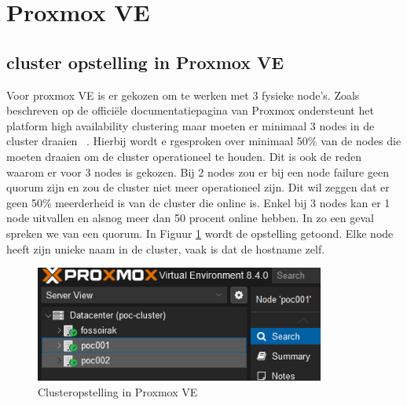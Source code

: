 


\section{Proxmox VE}%
\label{sec:ProxomoxVE}
\subsection{cluster opstelling in Proxmox VE}
Voor proxmox VE is er gekozen om te werken met 3 fysieke node's. Zoals beschreven op de officiële documentatiepagina van Proxmox ondersteunt het platform high availability clustering maar moeten er minimaal 3 nodes in de cluster draaien ~\autocite{proxmoxHA}.
Hierbij wordt e rgesproken over minimaal 50\% van de nodes die moeten draaien om de cluster operationeel te houden. Dit is ook de reden waarom er voor 3 nodes is gekozen.
Bij 2 nodes zou er bij een node failure geen quorum zijn en zou de cluster niet meer operationeel zijn. Dit wil zeggen dat er geen 50\% meerderheid is van de cluster die online is. Enkel bij 3 nodes kan er 1 node uitvallen en alsnog meer dan 50 procent online hebben. In zo een geval spreken we van een quorum.
In Figuur \ref{fig:cluster-proxmox} wordt de opstelling getoond. Elke node heeft zijn unieke naam in de cluster, vaak is dat de hostname zelf.
\begin{figure}[H]
  \centering
  \includegraphics[width=0.85\textwidth]{../poc/cluster-info-prox.png}
  \caption{Clusteropstelling in Proxmox VE}
  \label{fig:cluster-proxmox}
\end{figure}
